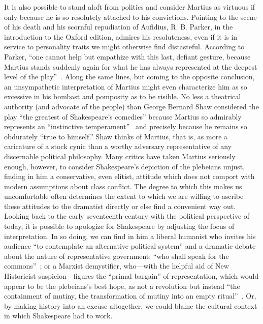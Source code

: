 It is also possible to stand aloft from politics and consider Martius as virtuous if only because he is so resolutely attached to his convictions.
Pointing to the scene of his death and his scornful repudiation of Aufidius, R. B. Parker, in the introduction to the Oxford edition, admires his resoluteness, even if it is in service to personality traits we might otherwise find distasteful.
According to Parker, ``one cannot help but empathize with this last, defiant gesture, because Martius stands suddenly again for what he has always represented at the deepest level of the play''~\cite[69]{parker_coriolanus_1994}.
Along the same lines, but coming to the opposite conclusion, an unsympathetic interpretation of Martius might even characterize him as so excessive in his bombast and pomposity as to be risible.
No less a theatrical authority (and advocate of the people) than George Bernard Shaw considered the play ``the greatest of Shakespeare's comedies'' because Martius so admirably represents an ``instinctive temperament''~\cite[509]{shaw_man_1962} and precisely because he remains so obdurately ``true to himself.''
Shaw thinks of Martius, that is, as more a caricature of a stock cynic than a worthy adversary representative of any discernable political philosophy. 
Many critics have taken Martius seriously enough, however, to consider Shakespeare's depiction of the plebeians unjust, finding in him a conservative, even elitist, attitude which does not comport with modern assumptions about class conflict.
The degree to which this makes us uncomfortable often determines the extent to which we are willing to ascribe these attitudes to the dramatist directly or else find a convenient way out.
Looking back to the early seventeenth-century with the political perspective of today, it is possible to apologize for Shakespeare by adjusting the focus of interpretation.
In so doing, we can find in him a liberal humanist who invites his audience ``to contemplate an alternative political system'' and a dramatic debate about the nature of representative government: ``who shall speak for the commons''~\cite[127]{patterson_shakespeare_1989}; or a Marxist demystifier, who---with the helpful aid of New Historicist suspicion---figures the ``primal bargain'' of representation, which would appear to be the plebeians's best hope, as not a revolution but instead ``the containment of mutiny, the transformation of mutiny into an empty ritual''~\cite[191--192]{arnold_third_2007}.
Or, by making history into an excuse altogether, we could blame the cultural context in which Shakespeare had to work.
